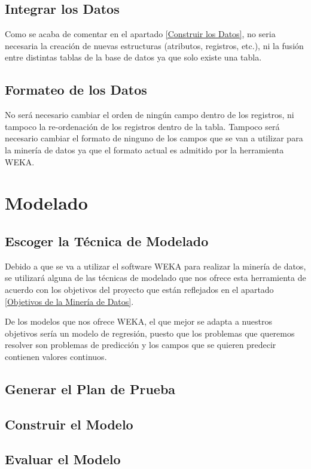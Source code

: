 \documentclass{article}
\begin{document}
\subsection{Integrar los Datos}
Como se acaba de comentar en el apartado \ref{Construir los Datos}, no seria necesaria la creación de nuevas estructuras (atributos, registros, etc.), ni la fusión entre distintas tablas de la base de datos ya que solo existe una tabla.

\subsection{Formateo de los Datos}
No será necesario cambiar el orden de ningún campo dentro de los registros, ni tampoco la re-ordenación de los registros dentro de la tabla. Tampoco será necesario cambiar el formato de ninguno de los campos que se van a utilizar para la minería de datos ya que el formato actual es admitido por la herramienta WEKA.

\section{Modelado}

\subsection{Escoger la Técnica de Modelado}
Debido a que se va a utilizar el software WEKA para realizar la minería de datos, se utilizará alguna de las técnicas de modelado que nos ofrece esta herramienta de acuerdo con los objetivos del proyecto que están reflejados en el apartado \ref{Objetivos de la Minería de Datos}.

De los modelos que nos ofrece WEKA, el que mejor se adapta a nuestros objetivos sería un modelo de regresión, puesto que los problemas que queremos resolver son problemas de predicción y los campos que se quieren predecir contienen valores continuos.

\subsection{Generar el Plan de Prueba}
\subsection{Construir el Modelo}
\subsection{Evaluar el Modelo}
\end{document}
